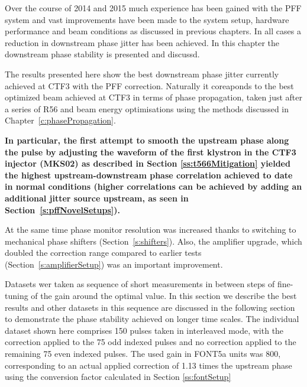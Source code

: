 
Over the course of 2014 and 2015 much experience has been gained with the PFF system
and vast improvements have been made to the system setup, hardware performance and
beam conditions as discussed in previous chapters. 
%
In all cases a reduction in downstream phase jitter has been achieved. In this chapter 
the downstream phase stability is presented and discussd.


The results presented here show the best downstream phase jitter 
currently achieved at CTF3 with the PFF correction. 
Naturally it coreaponds to the best optimized beam achieved at CTF3 in terms of
phase propagation, taken just after a series of R56 and beam energy optimisations
using the methods discussed in Chapter~\ref{c:phasePropagation}. 


{ \color{red} \bf In particular, the first attempt to smooth the upstream phase along 
the pulse by adjusting the waveform of the first klystron in the CTF3 injector (MKS02) 
as described in Section \ref{ss:t566Mitigation} yielded the highest upstream-downstream
phase correlation achieved to date in normal conditions (higher correlations can be
achieved by adding an additional jitter source upstream, as seen in 
Section~\ref{s:pffNovelSetups}).} 

At the same time phase monitor resolution was increased thanks to 
switching to mechanical phase shifters (Section~\ref{s:shifters}). 
Also, the amplifier upgrade, which doubled the correction range 
compared to earlier tests (Section~\ref{s:amplifierSetup}) was an important improvement.
 
Datasets wer taken 
as sequence of short measurements in between steps of fine-tuning of the gain around the optimal value. 
In this section we describe the best results and other
datasets in this sequence are discussed in the following section to demonstrate the 
phase stability achieved on longer time scales. The individual dataset shown here 
comprises 150 pulses taken in interleaved mode, with the correction applied to the 75 
odd indexed pulses and no correction applied to the remaining 75 even indexed pulses. 
The used gain in FONT5a units was 800, corresponding to an actual applied correction of 
1.13 times the upstream phase using the conversion factor calculated in Section 
\ref{ss:fontSetup}



